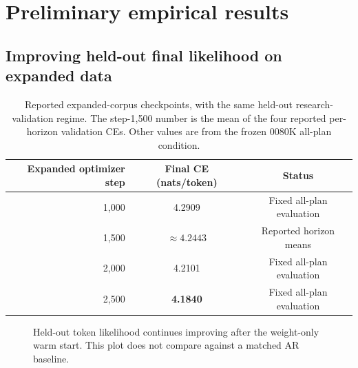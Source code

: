 \documentclass[11pt,letterpaper]{article}
\begin{document}
\section{Preliminary empirical results}
\subsection{Improving held-out final likelihood on expanded data}
\begin{table}[ht]
\centering
\caption{Reported expanded-corpus checkpoints, with the same held-out research-validation regime. The step-1,500 number is the mean of the four reported per-horizon validation CEs. Other values are from the frozen 0080K all-plan condition.}
\label{tab:curve}
\begin{tabular}{@{}rcc@{}}\toprule
Expanded optimizer step & Final CE (nats/token) & Status \\ \midrule
1,000 & 4.2909 & Fixed all-plan evaluation\\
1,500 & $\approx 4.2443$ & Reported horizon means\\
2,000 & 4.2101 & Fixed all-plan evaluation\\
2,500 & \textbf{4.1840} & Fixed all-plan evaluation\\
\bottomrule\end{tabular}
\end{table}

\begin{figure}[ht]
\centering
{}
\caption{Held-out token likelihood continues improving after the weight-only warm start. This plot does not compare against a matched AR baseline.}
\label{fig:cecurve}
\end{figure}
\end{document}
